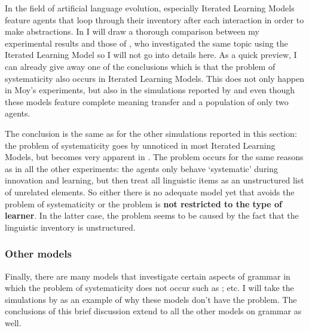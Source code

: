 In the field of artificial language evolution, especially Iterated Learning Models feature agents that loop through their inventory after each interaction in order to make abstractions. In  I will draw a thorough comparison between my experimental results and those of \citet{moy06case}, who investigated the same topic using the Iterated Learning Model so I will not go into details here. As a quick preview, I can already give away one of the conclusions which is that the problem of systematicity also occurs in Iterated Learning Models. This does not only happen in Moy's experiments, but also in the simulations reported by \citet{kirby00syntax} and \citet{smith03iterated} even though these models feature complete meaning transfer and a population of only two agents.

The conclusion is the same as for the other simulations reported in this section: the problem of systematicity goes by unnoticed in most Iterated Learning Models, but becomes very apparent in \citet{moy06case}. The problem occurs for the same reasons as in all the other experiments: the agents only behave `systematic' during innovation and learning, but then treat all linguistic items as an unstructured list of unrelated elements. So either there is no adequate model yet that avoids the problem of systematicity or the problem is {\bfseries not restricted to the type of learner}. In the latter case, the problem seems to be caused by the fact that the linguistic inventory is unstructured.


\subsubsection{Other models}
 Finally, there are many models that investigate certain aspects of grammar in which the problem of systematicity does not occur such as \citet{debeule07compositionality, debeule06emergence, nowak99evolution, steels06how-grammar}; etc. I will take the simulations by \citet{debeule06emergence} as an example of why these models don't have the problem. The conclusions of this brief discussion extend to all the other models on grammar as well.

